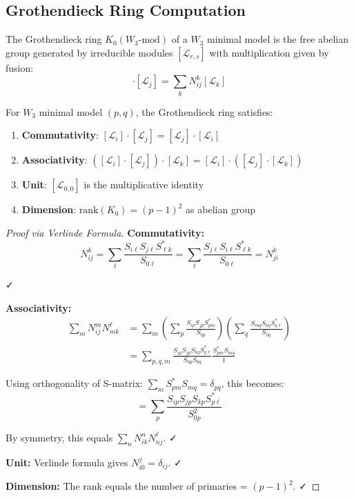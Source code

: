 \subsection{Grothendieck Ring Computation}
\label{subsec:grothendieck-ring}

\begin{definition}\label{def:grothendieck-w3}
The Grothendieck ring $K_0(W_3\text{-mod})$ of a $W_3$ minimal model is the 
free abelian group generated by irreducible modules $[\mathcal{L}_{r,s}]$ with 
multiplication given by fusion:
\begin{equation}
[\mathcal{L}_i] \cdot [\mathcal{L}_j] = \sum_k N_{ij}^k [\mathcal{L}_k]
\end{equation}
\end{definition}

\begin{theorem}\label{thm:grothendieck-structure}
For $W_3$ minimal model $(p,q)$, the Grothendieck ring satisfies:
\begin{enumerate}
\item \textbf{Commutativity}: $[\mathcal{L}_i] \cdot [\mathcal{L}_j] = 
[\mathcal{L}_j] \cdot [\mathcal{L}_i]$
\item \textbf{Associativity}: $([\mathcal{L}_i] \cdot [\mathcal{L}_j]) \cdot 
[\mathcal{L}_k] = [\mathcal{L}_i] \cdot ([\mathcal{L}_j] \cdot [\mathcal{L}_k])$
\item \textbf{Unit}: $[\mathcal{L}_{0,0}]$ is the multiplicative identity
\item \textbf{Dimension}: $\text{rank}(K_0) = (p-1)^2$ as abelian group
\end{enumerate}
\end{theorem}

\begin{proof}[Proof via Verlinde Formula]

\textbf{Commutativity:}
$$N_{ij}^k = \sum_\ell \frac{S_{i\ell}S_{j\ell}S_{\ell k}^*}{S_{0\ell}} 
= \sum_\ell \frac{S_{j\ell}S_{i\ell}S_{\ell k}^*}{S_{0\ell}} = N_{ji}^k$$

✓

\textbf{Associativity:}
\begin{align}
\sum_m N_{ij}^m N_{mk}^\ell &= \sum_m \left(\sum_p \frac{S_{ip}S_{jp}S_{pm}^*}{S_{0p}}\right)
\left(\sum_q \frac{S_{mq}S_{kq}S_{q\ell}^*}{S_{0q}}\right) \\
&= \sum_{p,q,m} \frac{S_{ip}S_{jp}S_{kq}S_{q\ell}^*}{S_{0p}S_{0q}} 
\frac{S_{pm}^* S_{mq}}{1}
\end{align}

Using orthogonality of S-matrix: $\sum_m S_{pm}^* S_{mq} = \delta_{pq}$, this becomes:
$$= \sum_p \frac{S_{ip}S_{jp}S_{kp}S_{p\ell}^*}{S_{0p}^2}$$

By symmetry, this equals $\sum_n N_{ik}^n N_{nj}^\ell$. ✓

\textbf{Unit:} Verlinde formula gives $N_{i0}^j = \delta_{ij}$. ✓

\textbf{Dimension:} The rank equals the number of primaries = $(p-1)^2$. ✓
\end{proof}

